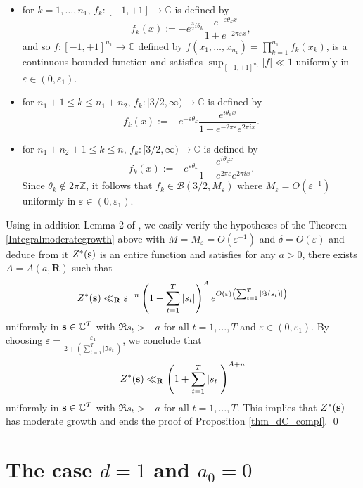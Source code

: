 \documentclass[a4paper,12pt]{article}
\theoremstyle{definition}
\numberwithin{equation}{section}
\def\Z{{\mathbb Z}}
\def\C{{\mathbb C}}
\def\s{{\bf s}}
\newcommand{\ii}{i}
\newcommand{\phie}{e}
\def\eps{{\varepsilon}}
\let\ds=\displaystyle
\begin{document}
\begin{itemize}
\item[$\bullet$] for $k=1,\ldots, n_1$, $f_k:[-1,+1]\to \C$ is defined by 
$$f_k(x):=-\phie^{\frac{3}{2} \ii \theta_k}
\frac{\phie^{-\eps\theta_k x}}{1+\phie^{-2\pi \eps x}},$$
and so $f:[-1,+1]^{n_1}\to \C$ defined by $f(x_1,\ldots, x_{n_1})=\prod_{k=1}^{n_1} f_k(x_k)$, is a continuous bounded function and satisfies $\sup_{[-1,+1]^{n_1}}|f|\ll 1$ uniformly in $\eps \in (0,\eps_1)$.
\item[$\bullet$] for $n_1+1\leq k \leq n_1+n_2$, $f_k:[3/2,\infty)\to \C$ is defined by 
$$f_k(x):=-\phie^{-\eps \theta_k}
\frac{\phie^{\ii\theta_k x}}{1-\phie^{-2\pi \eps}\phie^{2\pi \ii x}}.$$
\item[$\bullet$] for $n_1+n_2+1\leq k \leq n$, $f_k:[3/2,\infty)\to \C$ is defined by 
$$f_k(x):=-\phie^{\eps \theta_k}
\frac{\phie^{\ii\theta_k x}}{1-\phie^{2\pi \eps}\phie^{2\pi \ii x}}.$$
Since $\theta_k \not \in 2\pi \Z$, it follows that 
$f_k \in \mathcal B(3/2, M_\eps)$ where $M_\eps =O(\eps^{-1})$ uniformly in $\eps \in (0,\eps_1)$.
\end{itemize}

Using in addition Lemma 2 of \cite{Esso97}, we  easily verify the hypotheses of the Theorem \ref{Integralmoderategrowth} above with $M=M_\eps =O(\eps^{-1})$ and $\delta = O(\eps)$ and deduce from it $Z^*(\s)$ is an entire function and satisfies for any $a>0$, there exists $A=A(a, \mathbf{R})$ such that 
$$Z^*(\s) \ll_{\mathbf{R}} \eps^{-n} \left(1+\sum_{t=1}^T |s_t| \right)^A \phie^{O(\eps) \left(\sum_{t=1}^T |\Im (s_t)|\right)}$$
uniformly in $\s \in \C^T$ with $\Re s_t>-a$ for all $t=1,\ldots, T$ and $\eps \in (0,\eps_1)$.
By choosing $\ds \eps =\frac{\eps_1}{2+\left(\sum_{t=1}^T |\Im s_t|\right)}$, we conclude that 
$$Z^*(\s) \ll_{\mathbf{R}} \left(1+\sum_{t=1}^T |s_t| \right)^{A+n} $$
uniformly in $\s \in \C^T$ with $\Re s_t>-a$ for all $t=1,\ldots, T$.
This implies that $Z^*(\s)$ has moderate growth and ends the proof of Proposition \ref{thm_dC_compl}. \qed


\section{The case \texorpdfstring{$d=1$}{d equal 1} and \texorpdfstring{$a_0=0$}{a0 equal 0}}
\label{section:case_d_equal_1}
\end{document}
